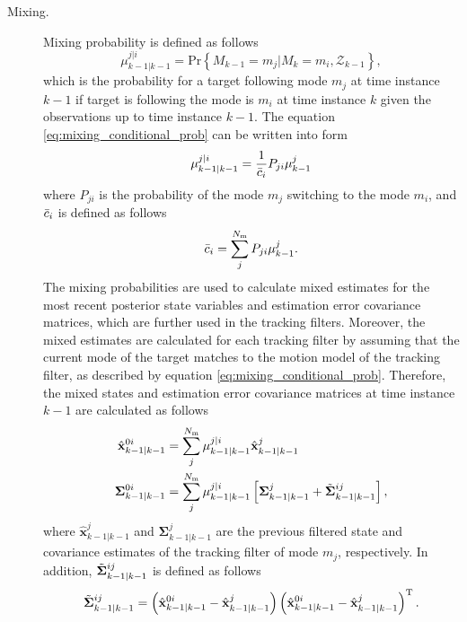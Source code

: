 \documentclass[english, 12pt, a4paper, elec, utf8, a-1b, online]{aaltothesis}
\numberwithin{equation}{section}
\renewcommand{\vec}[1]{\mathbf{#1}}
\renewcommand{\Pr}[1]{\text{Pr}\left\{ #1 \right\}}
\newcommand{\transpose}[1]{#1^\text{T}}
\newcommand{\lastmxprobs}{\mu^{j|i}_{k-1|k-1}}
\newcommand{\mxnorm}{ \Bar{c}_i }
\newcommand{\xmxinit}{\hat{\vec{x}}^{0i}_{k-1|k-1}}
\newcommand{\ecovmxinit}{\bm{\Sigma}^{0i}_{k-1|k-1}}
\newcommand{\modexlast}{\hat{\vec{x}}^{j}_{k-1|k-1}}
\newcommand{\modecovlast}{\bm{\Sigma}^j_{k-1|k-1}}
\newcommand{\modemxcovlast}{\Tilde{\bm{\Sigma}}^{ij}_{k-1|k-1}}
\newcommand{\nmodels}{{N_\text{m}}}
\begin{document}
\begin{description}
\item[Mixing.]

Mixing probability is defined as follows
\begin{equation}\label{eq:mixing_conditional_prob}
    \lastmxprobs = \Pr{M_{k-1}=m_j|M_{k}=m_i, \mathcal{Z}_{k-1}},
\end{equation}
which is the probability for a target following mode $m_j$ at time instance $k-1$ if target is following the mode is $m_i$ at time instance $k$ given the observations up to time instance $k-1$.
The equation \eqref{eq:mixing_conditional_prob} can be written into form
\begin{equation}
    \lastmxprobs = \frac{1}{\mxnorm} P_{ji} \mu^j_{k-1} \label{eq:imm_mx_probs}
\end{equation}
where $P_{ji}$ is the probability of the mode $m_j$ switching to the mode $m_i$, and $\mxnorm$ is defined as follows
\begin{equation}
    \mxnorm = \sum_j^\nmodels P_{ji} \mu^j_{k-1}. \label{eq:imm_mx_normalization}
\end{equation}
The mixing probabilities are used to calculate mixed estimates for the most recent posterior state variables and estimation error covariance matrices, which are further used in the tracking filters.
Moreover, the mixed estimates are calculated for each tracking filter by assuming that the current mode of the target matches to the motion model of the tracking filter, as described by equation \eqref{eq:mixing_conditional_prob}.
Therefore, the mixed states and estimation error covariance matrices at time instance $k-1$ are calculated as follows
\begin{align}
    \xmxinit &= \sum_j^\nmodels \lastmxprobs \modexlast \label{eq:imm_mx_init_x}\\
    \ecovmxinit &= \sum_j^\nmodels \lastmxprobs \left[ \modecovlast + \modemxcovlast \right], \label{eq:imm_mx_init_P}
\end{align}
where $\modexlast$ and $\modecovlast$ are the previous filtered state and covariance estimates of the tracking filter of mode $m_j$, respectively. 
In addition, $\modemxcovlast$ is defined as follows
\begin{equation}
    \modemxcovlast = 
    \left( \xmxinit - \modexlast  \right) 
    \transpose{\left( \xmxinit - \modexlast   \right)}.\label{eq:imm_mx_init_Ptilde}
\end{equation}


\end{description}
\end{document}
